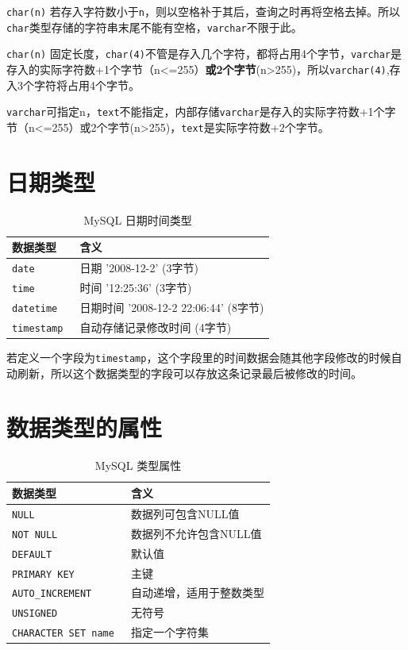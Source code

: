 \documentclass[UTF8,a4paper,12pt]{ctexbook}
\begin{document}
		\verb|char(n)| 若存入字符数小于\verb|n|，则以空格补于其后，查询之时再将空格去掉。所以\verb|char|类型存储的字符串末尾不能有空格，\verb|varchar|不限于此。
		
		\verb|char(n)| 固定长度，\verb|char(4)|不管是存入几个字符，都将占用4个字节，\verb|varchar|是存入的实际字符数+1个字节（n<=255）\textbf{或2个字节}(n>255)，所以\verb|varchar(4)|,存入3个字符将占用4个字节。
		
		\verb|varchar|可指定n，\verb|text|不能指定，内部存储\verb|varchar|是存入的实际字符数+1个字节（n<=255）或2个字节(n>255)，\verb|text|是实际字符数+2个字节。
		
		
	\section{日期类型}
		\begin{table}[H]
			\centering
			\caption{MySQL 日期时间类型}
			\begin{tabular}{p{5cm}<{\centering}|p{11cm}<{\centering}}
				\toprule
					数据类型  &  含义\\
				\midrule
					\verb|date | &  日期 '2008-12-2' (3字节)\\
					\verb|time | &  时间 '12:25:36' (3字节)\\
					\verb|datetime | & 日期时间 '2008-12-2 22:06:44' (8字节)\\
					\verb|timestamp | & 自动存储记录修改时间 (4字节)\\
				\bottomrule
			\end{tabular}
		\end{table}	
		
		若定义一个字段为\verb|timestamp|，这个字段里的时间数据会随其他字段修改的时候自动刷新，所以这个数据类型的字段可以存放这条记录最后被修改的时间。
		
	\section{数据类型的属性}
		\begin{table}[H]
			\centering
			\caption{MySQL 类型属性}
			\begin{tabular}{p{5cm}<{\centering}|p{11cm}<{\centering}}
				\toprule
					数据类型  &  含义\\
				\midrule
					\verb|NULL | &  数据列可包含NULL值 \\
					\verb|NOT NULL | &  数据列不允许包含NULL值 \\
					\verb|DEFAULT | & 默认值 \\
					\verb|PRIMARY KEY | & 主键 \\
					\verb|AUTO_INCREMENT | & 自动递增，适用于整数类型 \\
					\verb|UNSIGNED | & 无符号 \\
					\verb|CHARACTER SET name | & 指定一个字符集 \\
				\bottomrule
			\end{tabular}
		\end{table}			
				
\end{document}
